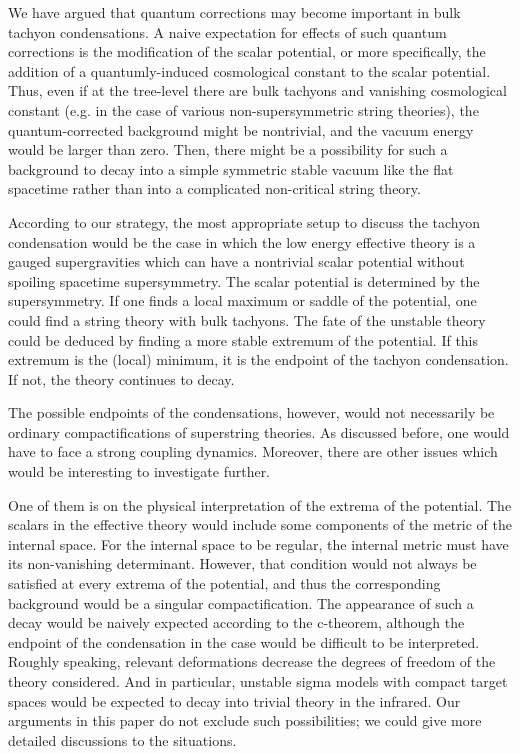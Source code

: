 \documentclass[a4paper,a4paper]{article}
\begin{document}
We have argued that quantum corrections may become important in bulk tachyon condensations. 
A naive expectation for effects of such quantum corrections is the modification of the scalar potential, or more 
specifically, the addition of a quantumly-induced cosmological constant to the scalar potential. 
Thus, even if at the tree-level there are bulk tachyons and vanishing cosmological constant (e.g. in the case of 
various non-supersymmetric string theories), 
the quantum-corrected background might be nontrivial, and the vacuum energy would 
be larger than zero. 
Then, there might be a 
possibility for such a background to decay into a simple symmetric stable vacuum like the flat spacetime 
rather than into a complicated 
non-critical string theory. 

According to our strategy, 
the most appropriate setup to discuss the tachyon condensation would be the case in which the low energy 
effective theory is a gauged supergravities which can have a nontrivial scalar potential without spoiling 
spacetime supersymmetry. 
The scalar potential is determined by the supersymmetry. 
If one finds a local maximum or saddle of the potential, one could find a string theory with bulk tachyons. 
The fate of the unstable theory could be deduced by finding a more stable extremum of the potential. 
If this extremum is the (local) minimum, it is the endpoint of the tachyon condensation. 
If not, the theory continues to decay. 

The possible endpoints of the condensations, however, would not necessarily be ordinary compactifications of 
superstring theories. 
As discussed before, one would have to face a strong coupling dynamics. 
Moreover, there are other issues which would be interesting to investigate further. 

One of them is on the physical interpretation of the extrema of the potential. 
The scalars in the effective theory would include some components of the metric of the internal space. 
For the internal space to be regular, the internal metric must have its non-vanishing determinant. 
However, that condition would not always be satisfied at every extrema of the potential, and thus the corresponding 
background would be a singular compactification. 
The appearance of such a decay would be naively expected according to the c-theorem, 
although the endpoint of the condensation in the case would be difficult to be interpreted. 
Roughly speaking, relevant deformations decrease the degrees of freedom of the theory considered. 
And in particular, unstable sigma models with compact target spaces would be expected to decay into trivial theory 
in the 
infrared. 
Our arguments in this paper do not exclude such possibilities; we could give more detailed discussions to 
the situations. 
\end{document}
